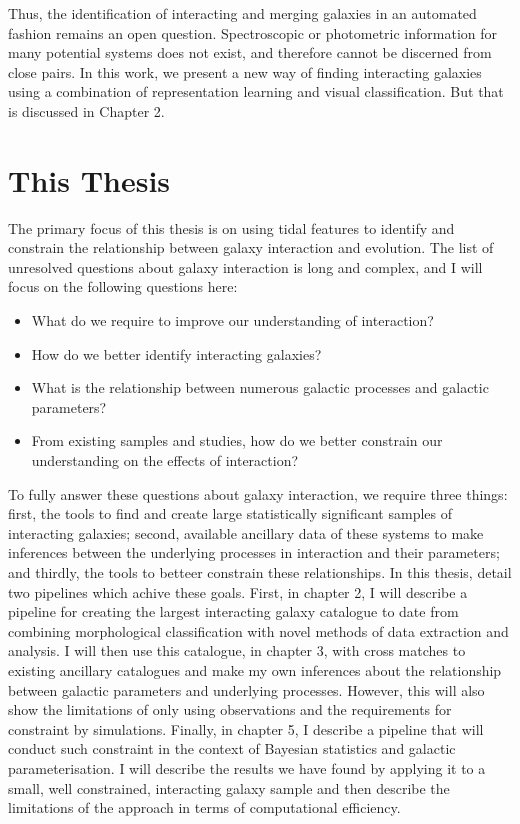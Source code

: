 Thus, the identification of interacting and merging galaxies in an automated fashion remains an open question. Spectroscopic or photometric information for many potential systems does not exist, and therefore cannot be discerned from close pairs. In this work, we present a new way of finding interacting galaxies using a combination of representation learning \citep{2022MNRAS.513.1581W} and visual classification. But that is discussed in Chapter 2.

\section{This Thesis}
\noindent The primary focus of this thesis is on using tidal features to identify and constrain the relationship between galaxy interaction and evolution. The list of unresolved questions about galaxy interaction is long and complex, and I will focus on the following questions here:

\begin{itemize}
	\item What do we require to improve our understanding of interaction?
	\item How do we better identify interacting galaxies?
	\item What is the relationship between numerous galactic processes and galactic parameters?
	\item From existing samples and studies, how do we better constrain our understanding on the effects of interaction?
\end{itemize}

To fully answer these questions about galaxy interaction, we require three things: first, the tools to find and create large statistically significant samples of interacting galaxies; second, available ancillary data of these systems to make inferences between the underlying processes in interaction and their parameters; and thirdly, the tools to betteer constrain these relationships. In this thesis, detail two pipelines which achive these goals. First, in chapter 2, I will describe a pipeline for creating the largest interacting galaxy catalogue to date from combining morphological classification with novel methods of data extraction and analysis. I will then use this catalogue, in chapter 3, with cross matches to existing ancillary catalogues and make my own inferences about the relationship between galactic parameters and underlying processes. However, this will also show the limitations of only using observations and the requirements for constraint by simulations. Finally, in chapter 5,  I describe a pipeline that will conduct such constraint in the context of Bayesian statistics and galactic parameterisation. I will describe the results we have found by applying it to a small, well constrained, interacting galaxy sample and then describe the limitations of the approach in terms of computational efficiency.